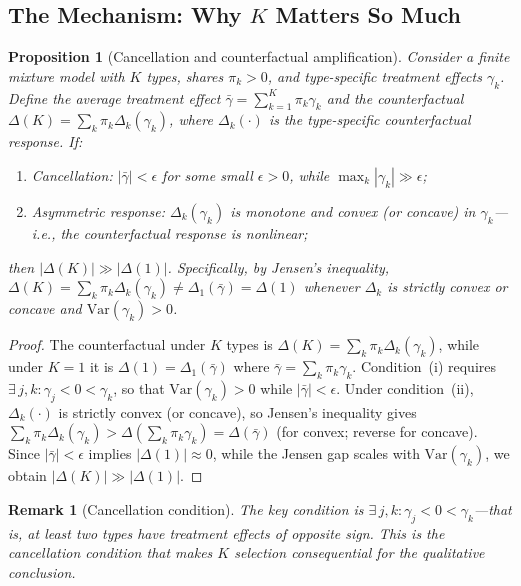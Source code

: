 \documentclass[12pt]{article}
\newtheorem{proposition}{Proposition}
\newtheorem{remark}{Remark}
\begin{document}
\subsection{The Mechanism: Why $K$ Matters So Much}

\begin{proposition}[Cancellation and counterfactual amplification]
\label{prop:cancellation}
Consider a finite mixture model with $K$ types, shares $\pi_k > 0$, and type-specific treatment effects $\gamma_k$. Define the average treatment effect $\bar{\gamma} = \sum_{k=1}^{K} \pi_k \gamma_k$ and the counterfactual $\Delta(K) = \sum_k \pi_k \Delta_k(\gamma_k)$, where $\Delta_k(\cdot)$ is the type-specific counterfactual response. If:
\begin{enumerate}
    \item[(i)] \textit{Cancellation}: $|\bar{\gamma}| < \epsilon$ for some small $\epsilon > 0$, while $\max_k |\gamma_k| \gg \epsilon$;
    \item[(ii)] \textit{Asymmetric response}: $\Delta_k(\gamma_k)$ is monotone and convex (or concave) in $\gamma_k$---i.e., the counterfactual response is nonlinear;
\end{enumerate}
then $|\Delta(K)| \gg |\Delta(1)|$. Specifically, by Jensen's inequality, $\Delta(K) = \sum_k \pi_k \Delta_k(\gamma_k) \neq \Delta_1(\bar{\gamma}) = \Delta(1)$ whenever $\Delta_k$ is strictly convex or concave and $\text{Var}(\gamma_k) > 0$.
\end{proposition}

\begin{proof}
The counterfactual under $K$ types is $\Delta(K) = \sum_{k} \pi_k \Delta_k(\gamma_k)$, while under $K=1$ it is $\Delta(1) = \Delta_1(\bar{\gamma})$ where $\bar{\gamma} = \sum_k \pi_k \gamma_k$. Condition~(i) requires $\exists\, j, k: \gamma_j < 0 < \gamma_k$, so that $\text{Var}(\gamma_k) > 0$ while $|\bar{\gamma}| < \epsilon$. Under condition~(ii), $\Delta_k(\cdot)$ is strictly convex (or concave), so Jensen's inequality gives $\sum_k \pi_k \Delta_k(\gamma_k) > \Delta(\sum_k \pi_k \gamma_k) = \Delta(\bar{\gamma})$ (for convex; reverse for concave). Since $|\bar{\gamma}| < \epsilon$ implies $|\Delta(1)| \approx 0$, while the Jensen gap scales with $\text{Var}(\gamma_k)$, we obtain $|\Delta(K)| \gg |\Delta(1)|$.
\end{proof}

\begin{remark}[Cancellation condition]
The key condition is $\exists\, j,k: \gamma_j < 0 < \gamma_k$---that is, at least two types have treatment effects of opposite sign. This is the \textit{cancellation condition} that makes $K$ selection consequential for the qualitative conclusion.
\end{remark}
\end{document}
